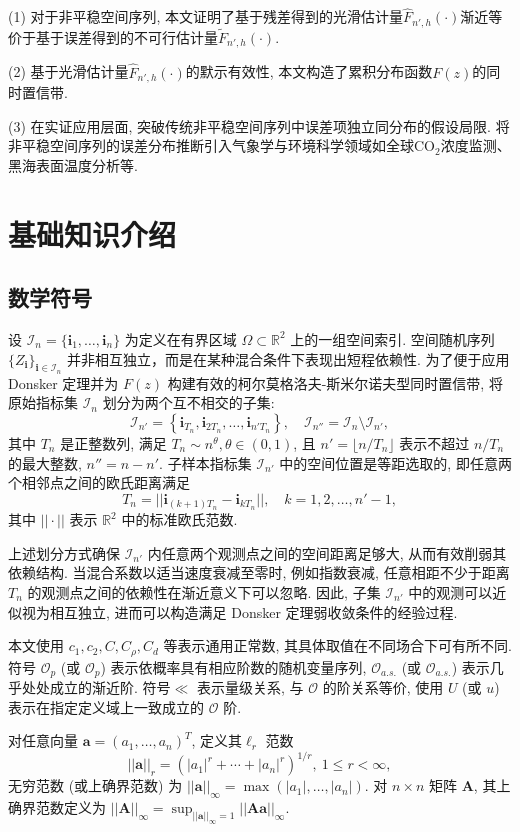 \documentclass[a4paper,openay,14pt]{ctexbook}
\numberwithin{equation}{section}
\numberwithin{lem}{section}
\newcommand{\chapterwithfancyheader}[1]{  
    \chapter{#1} %
    \thispagestyle{fancy} %
}
\begin{document}
(1) 对于非平稳空间序列, 本文证明了基于残差得到的光滑估计量$\hat{F}_{n',h}(\cdot)$渐近等价于基于误差得到的不可行估计量$\tilde{F}_{n',h}(\cdot)$.

(2) 基于光滑估计量$\hat{F}_{n',h}(\cdot)$的默示有效性, 本文构造了累积分布函数$F(z)$的同时置信带.

(3) 在实证应用层面, 突破传统非平稳空间序列中误差项独立同分布的假设局限. 将非平稳空间序列的误差分布推断引入气象学与环境科学领域如全球CO$_2$浓度监测、黑海表面温度分析等.

\chapterwithfancyheader{基础知识介绍}\label{SEC: Preliminary}

\section{数学符号}
设 \(\mathcal{I}_n = \{\mathbf{i}_1, \ldots, \mathbf{i}_n\}\) 为定义在有界区域 \(\Omega \subset \mathbb{R}^2\) 上的一组空间索引. 空间随机序列 $\{Z_{\mathbf{i}}\}_{\mathbf{i} \in \mathcal{I}_n}$ 并非相互独立，而是在某种混合条件下表现出短程依赖性. 为了便于应用 Donsker 定理并为 $F(z)$ 构建有效的柯尔莫格洛夫-斯米尔诺夫型同时置信带, 将原始指标集 $\mathcal{I}_n$ 划分为两个互不相交的子集:
\[
\mathcal{I}_{n'} = \left\{ \mathbf{i}_{T_n}, \mathbf{i}_{2T_n}, \ldots, \mathbf{i}_{n' T_n} \right\}, 
\quad 
\mathcal{I}_{n''} = \mathcal{I}_n \setminus \mathcal{I}_{n'},
\]
其中 $T_n$ 是正整数列, 满足 $T_n \sim n^{\theta}, \theta \in (0,1)$, 且 $n' = \lfloor n / T_n \rfloor$ 表示不超过 $n/T_n$ 的最大整数, $n'' = n - n'$. 子样本指标集 $\mathcal{I}_{n'}$ 中的空间位置是等距选取的, 即任意两个相邻点之间的欧氏距离满足
\[
T_n = ||\mathbf{i}_{(k+1)T_n} - \mathbf{i}_{kT_n}||, \quad k = 1,2,\dots,n'-1,
\]
其中 $||\cdot||$ 表示 $\mathbb{R}^2$ 中的标准欧氏范数.

上述划分方式确保 $\mathcal{I}_{n'}$ 内任意两个观测点之间的空间距离足够大, 从而有效削弱其依赖结构. 当混合系数以适当速度衰减至零时, 例如指数衰减, 任意相距不少于距离 $T_n$ 的观测点之间的依赖性在渐近意义下可以忽略. 因此, 子集 $\mathcal{I}_{n'}$ 中的观测可以近似视为相互独立, 进而可以构造满足 Donsker 定理弱收敛条件的经验过程.

本文使用 $c_1, c_2, C, C_\rho, C_d$ 等表示通用正常数, 其具体取值在不同场合下可有所不同.
符号 $\mathcal{O}_p$ (或 $\scriptstyle{\mathcal{O}}_p$) 表示依概率具有相应阶数的随机变量序列,  $\mathcal{O}_{a.s.}$ (或 $\scriptstyle{\mathcal{O}}_{a.s.}$) 表示几乎处处成立的渐近阶.
符号$\ll$ 表示量级关系, 与 $\mathcal{O}$ 的阶关系等价, 使用 $U$ (或 $u$) 表示在指定定义域上一致成立的 $\mathcal{O}$ 阶.

对任意向量 $\mathbf{a} = \left(a_1, \ldots, a_n\right)^T$, 定义其$\ell_r$ 范数
$$||\mathbf{a}||_r = \left( |a_1|^r + \cdots + |a_n|^r \right)^{1/r},\ 1 \leq r < \infty,$$
无穷范数 (或上确界范数) 为
\(
||\mathbf{a}||_{\infty} = \max \left( |a_1|, \ldots, |a_n| \right).
\)
对 $n \times n$ 矩阵 $\mathbf{A}$, 其上确界范数定义为
\(||\mathbf{A}||_{\infty} = \sup_{||\mathbf{a}||_{\infty} = 1} ||\mathbf{A}\mathbf{a}||_{\infty}.\)
\end{document}
